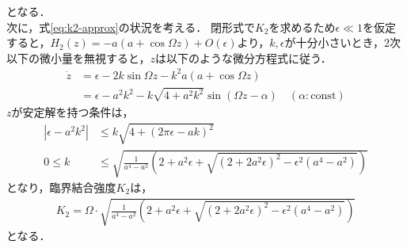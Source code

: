 \documentclass[../main]{subfiles}
\begin{document}
    となる．\\
    次に，式\eqref{eq:k2-approx}の状況を考える．
    閉形式で$K_2$を求めるため$\epsilon \ll 1$を仮定すると，$H_2(z)=-a(a+\cos\Omega z)+O(\epsilon)$より，$k,\epsilon$が十分小さいとき，$2$次以下の微小量を無視すると，$z$は以下のような微分方程式に従う．
    \begin{align*}
        \dot{z}&=\epsilon-2k\sin\Omega z-k^2a(a+\cos \Omega z)\\
        &=\epsilon-a^2k^2-k\sqrt{4+a^2k^2}\sin (\Omega z-\alpha)\quad(\alpha:\mathrm{const})
    \end{align*}
    $z$が安定解を持つ条件は，
    \begin{align*}
        |\epsilon-a^2k^2|&\leq k\sqrt{4+(2\pi\epsilon-ak)^2}\\
        0\leq k&\leq \sqrt{\frac{1}{a^4-a^2}\left(2+a^2\epsilon+\sqrt{(2+2a^2\epsilon)^2-\epsilon^2(a^4-a^2)}\right)}
    \end{align*}
    となり，臨界結合強度$K_2$は，
    \begin{align*}
        K_2=\Omega\cdot\sqrt{\frac{1}{a^4-a^2}\left(2+a^2\epsilon+\sqrt{(2+2a^2\epsilon)^2-\epsilon^2(a^4-a^2)}\right)}
    \end{align*}
    となる．    
\end{document}
